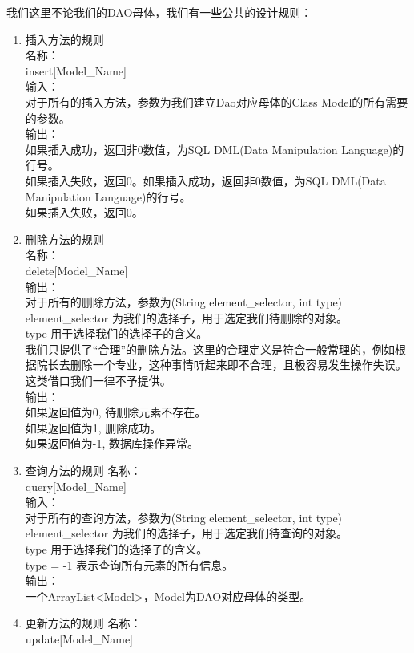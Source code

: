 \documentclass[../report.tex]{subfiles}
\begin{document}
我们这里不论我们的DAO母体，我们有一些公共的设计规则：
\begin{enumerate}
\ttfamily
\item 插入方法的规则\\
名称：\\
insert[Model\_Name]\\
输入：\\
对于所有的插入方法，参数为我们建立Dao对应母体的Class Model的所有需要的参数。\\
输出：\\
如果插入成功，返回非0数值，为SQL DML(Data Manipulation Language)的行号。\\
如果插入失败，返回0。如果插入成功，返回非0数值，为SQL DML(Data Manipulation Language)的行号。\\
如果插入失败，返回0。
\item 删除方法的规则\\
名称：\\
delete[Model\_Name]\\
输出：\\
对于所有的删除方法，参数为(String element\_selector, int type)\\
element\_selector 为我们的选择子，用于选定我们待删除的对象。\\
type 用于选择我们的选择子的含义。\\
我们只提供了“合理”的删除方法。这里的合理定义是符合一般常理的，例如根据院长去删除一个专业，这种事情听起来即不合理，且极容易发生操作失误。这类借口我们一律不予提供。\\
输出：\\
如果返回值为0, 待删除元素不存在。\\
如果返回值为1, 删除成功。\\
如果返回值为-1, 数据库操作异常。
\item 查询方法的规则
名称：\\
query[Model\_Name]\\
输入：\\
对于所有的查询方法，参数为(String element\_selector, int type)\\
element\_selector 为我们的选择子，用于选定我们待查询的对象。\\
type 用于选择我们的选择子的含义。\\
type = -1 表示查询所有元素的所有信息。\\
输出：\\
一个ArrayList<Model>，Model为DAO对应母体的类型。
\item 更新方法的规则
名称：\\
update[Model\_Name]\\

\end{enumerate}
\end{document}
